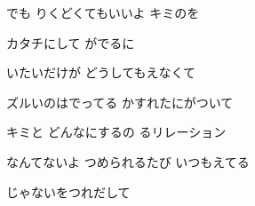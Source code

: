 \documentclass[14pt]{ltjsarticle}
\begin{document}
{  でも りくどくてもいいよ キミのを
  \jisho{}

  カタチにして がでるに
  \jisho{}

\item
  いたいだけが どうしてもえなくて
  \jisho{}

  ズルいのはでってる かすれたにがついて
  \jisho{}

\item
  キミと どんなにするの るリレーション
  \jisho{}

  なんてないよ つめられるたび いつもえてる
  \jisho{}

  じゃないをつれだして
  \jisho{}

}
\end{document}
